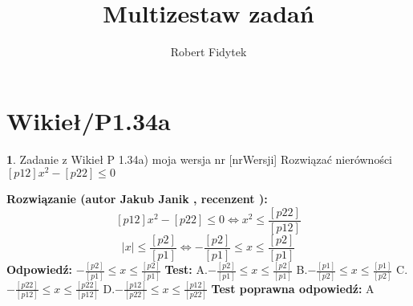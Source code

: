 \documentclass[12pt, a4paper]{article}
\title{Multizestaw zadań}
\author{Robert Fidytek}
\date{}
\theoremstyle{definition} %
\newtheorem{zad}{}
\newcommand{\kategoria}[1]{\section{#1}} %
\newcommand{\zadStart}[1]{\begin{zad}#1\newline} %
\newcommand{\zadStop}{\end{zad}}   %
\newcommand{\rozwStart}[2]{\noindent \textbf{Rozwiązanie (autor #1 , recenzent #2): }\newline} %
\newcommand{\rozwStop}{\newline}                                            %
\newcommand{\odpStart}{\noindent \textbf{Odpowiedź:}\newline}    %
\newcommand{\odpStop}{\newline}                                             %
\newcommand{\testStart}{\noindent \textbf{Test:}\newline} %
\newcommand{\testStop}{\newline} %
\newcommand{\kluczStart}{\noindent \textbf{Test poprawna odpowiedź:}\newline} %
\newcommand{\kluczStop}{\newline} %
\begin{document}
\maketitle


\kategoria{Wikieł/P1.34a}
\zadStart{Zadanie z Wikieł P 1.34a) moja wersja nr [nrWersji]}
Rozwiązać nierówności $[p12]x^2-[p22]\leq 0$
\zadStop
\rozwStart{Jakub Janik}{}
$$[p12]x^2-[p22]\leq 0 \Leftrightarrow x^2 \leq \frac{[p22]}{[p12]}$$
$$|x| \leq \frac{[p2]}{[p1]} \Leftrightarrow -\frac{[p2]}{[p1]} \leq x \leq \frac{[p2]}{[p1]}$$
\rozwStop
\odpStart
$-\frac{[p2]}{[p1]} \leq x \leq \frac{[p2]}{[p1]}$
\odpStop
\testStart
A.$-\frac{[p2]}{[p1]} \leq x \leq \frac{[p2]}{[p1]}$
B.$-\frac{[p1]}{[p2]} \leq x \leq \frac{[p1]}{[p2]}$
C.$-\frac{[p22]}{[p12]} \leq x \leq \frac{[p22]}{[p12]}$
D.$-\frac{[p12]}{[p22]} \leq x \leq \frac{[p12]}{[p22]}$
\testStop
\kluczStart
A
\kluczStop
\end{document}
